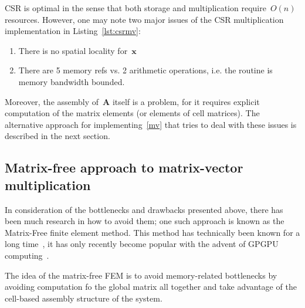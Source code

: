 \documentclass[12pt]{article}
\newcommand{\vect}[1]{\boldsymbol{\mathbf{#1}}}
\begin{document}
CSR is optimal in the sense that both storage and multiplication require~$O(n)$ resources. However, one may note two major issues of the CSR multiplication implementation in Listing~\ref{lst:csrmv}:
\begin{enumerate}
	\item There is no spatial locality for~$\vect x$
	\item There are 5 memory refs vs. 2 arithmetic operations, i.e. the routine is memory bandwidth bounded.
\end{enumerate}
Moreover, the assembly of~$\vect A$ itself is a problem, for it requires explicit computation of the matrix elements (or elements of cell matrices). The alternative approach for implementing~\eqref{mv} that tries to deal with these issues is described in the next section.

\subsection{Matrix-free approach to matrix-vector multiplication}\label{sec:mfree}

In consideration of the bottlenecks and drawbacks presented above, there has been much research in how to avoid them; one such approach is known as the Matrix-Free finite element method. This method has technically been known for a long time~\cite{carey1988element}, it has only recently become popular with the advent of GPGPU computing~\cite{step37}. 

The idea of the matrix-free FEM is to avoid memory-related bottlenecks by avoiding computation fo the global matrix all together and take advantage of the cell-based assembly structure of the system. 
\end{document}

